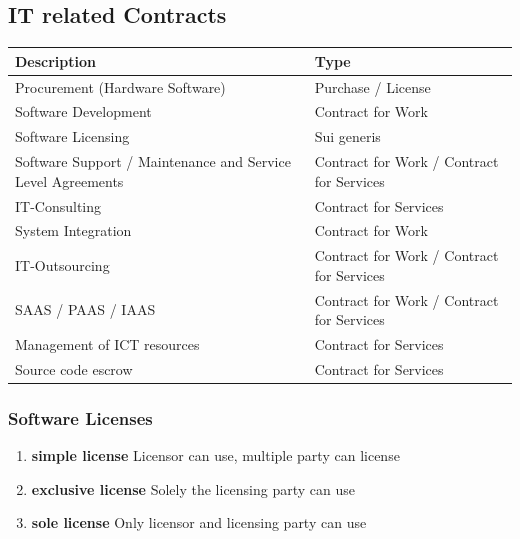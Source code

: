 \documentclass[11pt]{article}
\theoremstyle{definition}
\begin{document}
\subsection{IT related Contracts}
\begin{tabularx}{\linewidth}{X X}
	\hline
	\textbf{Description} & \textbf{Type} \\
	\hline
	Procurement (Hardware Software) & Purchase / License \\
	Software Development & Contract for Work \\
	Software Licensing & Sui generis \\
	Software Support / Maintenance and Service Level Agreements & Contract for Work / Contract for Services \\
	IT-Consulting & Contract for Services \\
	System Integration & Contract for Work \\
	IT-Outsourcing & Contract for Work / Contract for Services \\
	SAAS / PAAS / IAAS & Contract for Work / Contract for Services \\
	Management of ICT resources & Contract for Services \\
	Source code escrow & Contract for Services
\end{tabularx}

\subsubsection{Software Licenses}
\begin{enumerate}
	\item \textbf{simple license} Licensor can use, multiple party can license
	\item \textbf{exclusive license} Solely the licensing party can use
	\item \textbf{sole license} Only licensor and licensing party can use
\end{enumerate}
\end{document}
